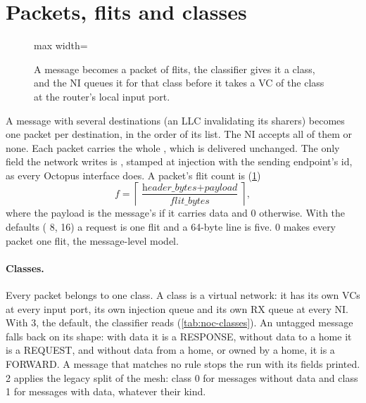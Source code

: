 \section{Packets, flits and classes}\label{sec:noc-packets}

\begin{figure}[htbp]\centering
\begin{adjustbox}{max width=\textwidth}\end{adjustbox}
\caption{A message becomes a packet of flits, the classifier gives it a class, and the NI queues
it for that class before it takes a VC of the class at the router's local input port.}
\label{fig:noc-packet}
\end{figure}

A message with several destinations (an LLC invalidating its sharers) becomes one packet per
destination, in the order of its  list. The NI accepts all of them or none. Each packet
carries the whole , which is delivered unchanged. The only field the network writes
is , stamped at injection with the sending endpoint's id, as every Octopus interface
does. A packet's flit count is (\cref{fig:noc-packet})
\[
f = \left\lceil \frac{\textit{header\_bytes} + \textit{payload}}{\textit{flit\_bytes}} \right\rceil ,
\]
where the payload is the message's  if it carries data and 0 otherwise. With the
defaults ( 8,  16) a request is one flit and a 64-byte line is
five.  0 makes every packet one flit, the message-level model.

\paragraph{Classes.} Every packet belongs to one class. A class is a virtual network: it has its
own VCs at every input port, its own injection queue and its own RX queue at every NI. With
 3, the default, the classifier reads 
(\cref{tab:noc-classes}). An untagged message falls back on its shape: with data it is a
RESPONSE, without data to a home it is a REQUEST, and without data from a home, or owned by a
home, it is a FORWARD. A message that matches no rule stops the run
with its fields printed.  2 applies the legacy split of the mesh: class 0 for
messages without data and class 1 for messages with data, whatever their kind.

